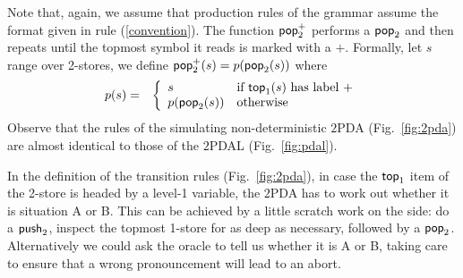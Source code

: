 Note that, again, we assume that production rules of the grammar
assume the format given in rule (\ref{convention}). The function
${\sf pop}_2^{+}$ performs a ${\sf pop}_2$ and then repeats until the topmost
symbol it reads is marked with a $+$. Formally, let $s$ range over 2-stores, we define ${\sf pop}_2^+ (s) =
p({\sf pop}_2(s))$ where
\begin{eqnarray}
\nonumber p (s)  & = &  \left \{
\begin{array}{ll}
s & \hbox{if ${\sf top}_1(s)$ has label $+$}\\
{p({\sf pop}_2 (s))} & \mbox{otherwise}
\end{array} \right .
\end{eqnarray}
Observe that the rules of the simulating non-deterministic $2$PDA
(Fig.~\ref{fig:2pda}) are almost identical to those of the $2$PDAL
(Fig.~\ref{fig:pdal}).

\begin{remark}
In the definition of the transition rules (Fig.~\ref{fig:2pda}), in
case the ${\sf top}_1$ item of the 2-store is headed by a level-1
variable, the $2$PDA has to work out whether it is situation A or
B. This can be achieved by a little scratch work on the side: do a
${\sf push}_2$, inspect the topmost 1-store for as deep as necessary,
followed by a ${\sf pop}_2$. Alternatively we could ask the oracle to tell
us whether it is A or B, taking care to ensure that a wrong
pronouncement will lead to an abort.
\end{remark}

